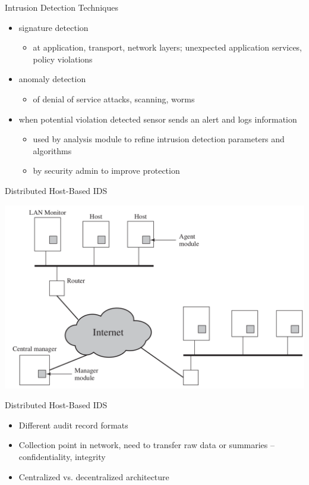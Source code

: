 \documentclass{beamer}
\begin{document}
\begin{frame}{Intrusion Detection Techniques}
  \begin{itemize}
  \item signature detection 
    \begin{itemize}
    \item at application, transport, network layers; unexpected 
      application services, policy violations 
    \end{itemize}
  \item anomaly detection 
    \begin{itemize}
    \item of denial of service attacks, scanning, worms 
    \end{itemize}
  \item when potential violation detected sensor sends an 
    alert and logs information 
    \begin{itemize}
    \item used by analysis module to refine intrusion detection 
      parameters and algorithms 
    \item by security admin to improve protection
    \end{itemize}
  \end{itemize}
\end{frame}

\begin{frame}{Distributed Host-Based IDS}
  
  \begin{center}
    \includegraphics[width=0.9\linewidth]{dist1}
  \end{center}
\end{frame}


\begin{frame}{Distributed Host-Based IDS }
  \begin{itemize}
  \item Different audit record formats 
  \item Collection point in network, need to transfer raw 
    data or summaries – confidentiality, integrity 
  \item Centralized vs. decentralized architecture
  \end{itemize}
\end{frame}
\end{document}
